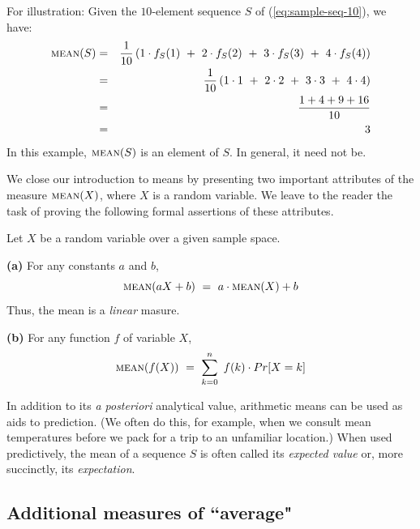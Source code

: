 For illustration: Given the $10$-element sequence $S$ of (\ref{eq:sample-seq-10}), we have:
\begin{eqnarray*}
\mbox{\sc mean}(S) & = &
{1 \over 10} \left(1 \cdot f_S(1) \ + \ 2 \cdot f_S(2) \ + \ 3 \cdot f_S(3) \ + \ 4 \cdot f_S(4) \right) \\
 & = &
{1 \over 10} \left(1 \cdot 1 \ + \ 2 \cdot 2 \ + \ 3 \cdot 3 \ + \ 4 \cdot 4 \right) \\
 & = &
\frac{1 + 4 + 9 + 16}{10} \\
 & = & 3
\end{eqnarray*}
In this example, $\mbox{\sc mean}(S)$ is an element of $S$.  In general, it need not be.

We close our introduction to means by presenting two important
attributes of the measure $\mbox{\sc mean}(X)$, where $X$ is a random
variable.  We leave to the reader the task of proving the following
formal assertions of these attributes.

\begin{prop} 
\label{thm:mean-linear}
Let $X$ be a random variable over a given sample space.

{\bf (a)} For any constants $a$ and $b$,
\[ \mbox{\sc mean}(aX+b) \ = \ a \cdot \mbox{\sc mean}(X) + b  \]
Thus, the mean is a {\em linear} masure.

{\bf (b)} For any function $f$ of variable $X$,
\[ \mbox{\sc mean}(f(X)) \ = \ \sum_{k=0}^n \ f(k) \cdot Pr[X = k] \]
\end{prop}

\bigskip

In addition to its {\em a posteriori} analytical value, arithmetic means can be used as aids to prediction.  (We often do this, for example, when we consult mean temperatures before we pack for a trip to an unfamiliar location.)  When used predictively, the mean of a sequence $S$ is often called its {\it expected value} or, more succinctly, its {\it expectation}.
 

\subsection{Additional measures of ``average"}
\label{sec:median-mode}

